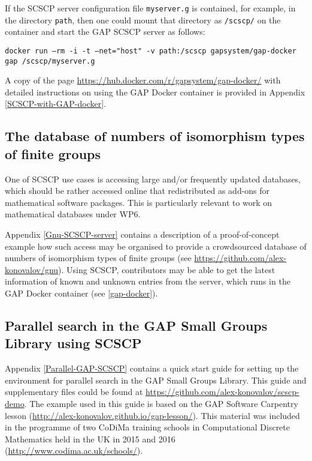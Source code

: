 \documentclass{deliverablereport}
\begin{document}
If the SCSCP server configuration file {\tt myserver.g} is 
contained, for example, in the directory {\tt path}, 
then one could mount that directory as {\tt /scscp/} on the
container and start the GAP SCSCP server as follows:

{\tiny{\tt docker run --rm -i -t --net="host" -v path:/scscp gapsystem/gap-docker gap /scscp/myserver.g}}

A copy of the page \url{https://hub.docker.com/r/gapsystem/gap-docker/}
with detailed instructions on using the GAP Docker container 
is provided in Appendix \ref{SCSCP-with-GAP-docker}.


\subsection{The database of numbers of isomorphism
types of finite groups}\label{gnu-reproducibility}

One of SCSCP use cases is accessing large and/or frequently updated
databases, which should be rather accessed online that redistributed as
add-ons for mathematical software packages. 
This is particularly relevant to work on mathematical databases under WP6.

Appendix \ref{Gnu-SCSCP-server}
contains a description of a proof-of-concept example how such access may
be organised to provide a crowdsourced database of numbers of isomorphism
types of finite groups (see  \url{https://github.com/alex-konovalov/gnu}). 
Using SCSCP, contributors may be able to get the latest information of 
known and unknown entries from the server, which runs in the GAP Docker 
container (see \ref{gap-docker}).


\subsection{Parallel search in the GAP Small Groups Library using SCSCP}

Appendix \ref{Parallel-GAP-SCSCP} contains a quick start guide for setting
up the environment for parallel search in the GAP Small Groups Library. This
guide and supplementary files could be found at \url{https://github.com/alex-konovalov/scscp-demo}. The example used in this guide is based on the GAP Software Carpentry
lesson (\url{http://alex-konovalov.github.io/gap-lesson/}). This material was
included in the programme of two CoDiMa training schools in Computational
Discrete Mathematics held in the UK in 2015 and 2016
(\url{http://www.codima.ac.uk/schools/}).
\end{document}
